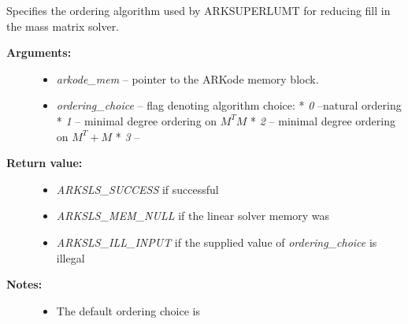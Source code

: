 \documentclass[letterpaper,10pt,english]{sphinxmanual}
\begin{document}
\begin{fulllineitems}
\label{c_interface/User_callable:ARKMassSuperLUMTSetOrdering}
Specifies the ordering algorithm used by ARKSUPERLUMT for reducing
fill in the mass matrix solver.
\begin{description}
\item[{\textbf{Arguments:}}] \leavevmode\begin{itemize}
\item {} 
\emph{arkode\_mem} -- pointer to the ARKode memory block.

\item {} 
\emph{ordering\_choice} -- flag denoting algorithm choice:
* \emph{0} --natural ordering
* \emph{1} -- minimal degree ordering on $M^TM$
* \emph{2} -- minimal degree ordering on $M^T + M$
* \emph{3} -- 

\end{itemize}

\item[{\textbf{Return value:}}] \leavevmode\begin{itemize}
\item {} 
\emph{ARKSLS\_SUCCESS}  if successful

\item {} 
\emph{ARKSLS\_MEM\_NULL} if the linear solver memory was 

\item {} 
\emph{ARKSLS\_ILL\_INPUT} if the supplied value of \emph{ordering\_choice} is illegal

\end{itemize}

\item[{\textbf{Notes:}}] \leavevmode\begin{itemize}
\item {} 
The default ordering choice is 

\end{itemize}

\end{description}

\end{fulllineitems}
\end{document}
